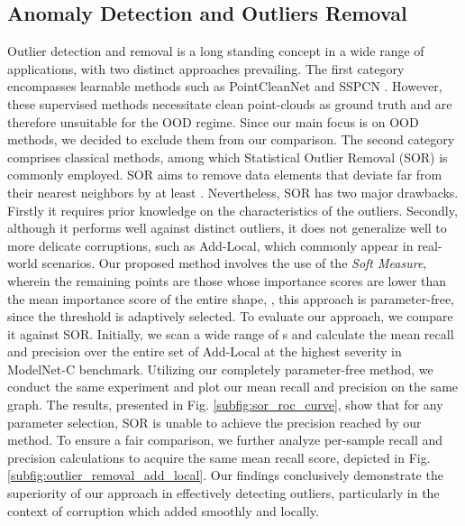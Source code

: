 \documentclass[10pt,twocolumn,letterpaper]{article}
\begin{document}
\subsection{Anomaly Detection and Outliers Removal}
Outlier detection and removal is a long standing concept in a wide range of applications, with two distinct approaches prevailing. The first category encompasses learnable methods such as PointCleanNet \cite{pointcleannet} and SSPCN \cite{learnable_outlier_removal1}. However, these supervised methods necessitate clean point-clouds as ground truth and are therefore unsuitable for the OOD regime. Since our main focus is on OOD methods, we decided to exclude them from our comparison. The second category comprises classical methods, among which Statistical Outlier Removal (SOR) \cite{sor, dupnet} is commonly employed. SOR aims to remove data elements that deviate far from their  nearest neighbors by at least . Nevertheless, SOR has two major drawbacks. Firstly it  requires prior knowledge on the characteristics of the outliers. Secondly, although it performs well against distinct outliers, it does not generalize well to more delicate corruptions, such as Add-Local, which commonly appear in real-world scenarios.
Our proposed method involves the use of the \textit{Soft Measure}, wherein the remaining points are those whose importance scores are lower than the mean importance score of the entire shape, , this approach is parameter-free, since the threshold is adaptively selected. To evaluate our approach, we compare it against SOR. Initially, we scan a wide range of s and calculate the mean recall and precision over the entire set of Add-Local at the highest severity in ModelNet-C \cite{modelnet_c} benchmark. Utilizing our completely parameter-free method, we conduct the same experiment and plot our mean recall and precision on the same graph. The results, presented in Fig. \ref{subfig:sor_roc_curve}, show that for any parameter selection, SOR is unable to achieve the precision reached by our method. To ensure a fair comparison, we further analyze per-sample recall and precision calculations to acquire the same mean recall score, depicted in Fig. \ref{subfig:outlier_removal_add_local}. Our findings conclusively demonstrate the superiority of our approach in effectively detecting outliers, particularly in the context of corruption which added smoothly and locally.
\end{document}
